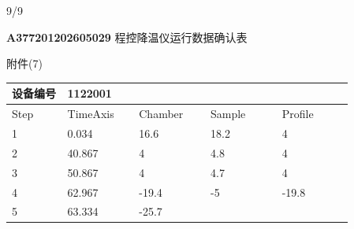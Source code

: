 \documentclass[UTF8,10pt,a4paper,fontset=fandol]{ctexart}
\newcommand{\fieldvalue}[1]{#1}
\newcommand{\handwritten}[1]{#1}
\begin{document}
\handwritten{9/9}

\newpage

\begin{center}
\textbf{A377201202605029} 程控降温仪运行数据确认表
\end{center}

\fieldvalue{\handwritten{附件(7)}}

\small

\begin{center}
\begin{tabular}{|p{0.14\linewidth}|p{0.18\linewidth}|p{0.18\linewidth}|p{0.18\linewidth}|p{0.18\linewidth}|}
\hline
设备编号 &
\fieldvalue{1122001} &
\multicolumn{3}{c|}{}\\
\hline
Step & TimeAxis & Chamber & Sample & Profile\\
\hline
1 &
\fieldvalue{0.034} &
\fieldvalue{16.6} &
\fieldvalue{18.2} &
\fieldvalue{4}\\
\hline
2 &
\fieldvalue{40.867} &
\fieldvalue{4} &
\fieldvalue{4.8} &
\fieldvalue{4}\\
\hline
3 &
\fieldvalue{50.867} &
\fieldvalue{4} &
\fieldvalue{4.7} &
\fieldvalue{4}\\
\hline
4 &
\fieldvalue{62.967} &
\fieldvalue{-19.4} &
\fieldvalue{-5} &
\fieldvalue{-19.8}\\
\hline
5 &
\fieldvalue{63.334} &
\fieldvalue{-25.7} &

\end{tabular}
\end{center}
\end{document}
